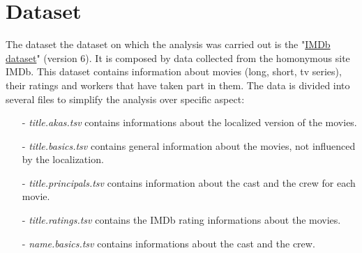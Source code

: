 \documentclass[14pt]{extarticle}
\begin{document}
\section{Dataset}
The dataset the dataset on which the analysis was carried out is the "\href{https://www.kaggle.com/ashirwadsangwan/imdb-dataset}{IMDb dataset}" (version 6). It is composed by data collected from the homonymous site IMDb. This dataset contains information about movies (long, short, tv series), their ratings and workers that have taken part in them. The data is divided into several files to simplify the analysis over specific aspect:
\begin{itemize}[leftmargin=*]
\vspace{-0.4cm}\item[-]{\it title.akas.tsv} contains informations about the localized version of the movies.
\vspace{-0.4cm}\item[-]{\it title.basics.tsv} contains general information about the movies, not influenced by the localization.
\vspace{-0.4cm}\item[-]{\it title.principals.tsv} contains information about the cast and the crew for each movie.
\vspace{-0.4cm}\item[-]{\it title.ratings.tsv} contains the IMDb rating informations about the movies.
\vspace{-1.0cm}\item[-]{\it name.basics.tsv} contains informations about the cast and the crew.
\end{itemize}
\end{document}
